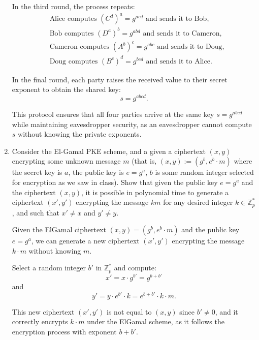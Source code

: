 \documentclass[12pt]{article}
\begin{document}
\begin{enumerate}
In the third round, the process repeats:
\[
\begin{aligned}
    &\text{Alice computes } (C^d)^a = g^{acd} \text{ and sends it to Bob,} \\
    &\text{Bob computes } (D^a)^b = g^{abd} \text{ and sends it to Cameron,} \\
    &\text{Cameron computes } (A^b)^c = g^{abc} \text{ and sends it to Doug,} \\
    &\text{Doug computes } (B^c)^d = g^{bcd} \text{ and sends it to Alice.}
\end{aligned}
\]

In the final round, each party raises the received value to their secret exponent to obtain the shared key:
\[
s = g^{abcd}.
\]

This protocol ensures that all four parties arrive at the same key \( s = g^{abcd} \) while maintaining eavesdropper security, as an eavesdropper cannot compute \( s \) without knowing the private exponents.


\item Consider the El-Gamal PKE scheme, and a given a ciphertext $(x,y)$  encrypting some unknown message $m$ (that is, $(x,y) := (g^b, e^b\cdot m)$ where the secret key is $a$, the public key is $e = g^a$, $b$ is some random integer selected for encryption as we saw in class). 
Show that given the public key $e = g^a$ and the ciphertext $(x,y)$, it is possible in polynomial time to generate a ciphertext $(x',y')$ encrypting the message $km$ for any desired integer $k \in \mathbb{Z}^*_p$, and such that $x' \neq x$ and $y'\neq y$. \newline

Given the ElGamal ciphertext \((x, y) = (g^b, e^b \cdot m)\) and the public key \(e = g^a\), we can generate a new ciphertext \((x', y')\) encrypting the message \(k \cdot m\) without knowing \(m\). 

Select a random integer \(b'\) in \(\mathbb{Z}^*_{p}\) and compute:
\[
x' = x \cdot g^{b'} = g^{b + b'}
\]
and
\[
y' = y \cdot e^{b'} \cdot k = e^{b + b'} \cdot k \cdot m.
\]

This new ciphertext \((x', y')\) is not equal to \((x, y)\) since \(b' \neq 0\), and it correctly encrypts \(k \cdot m\) under the ElGamal scheme, as it follows the encryption process with exponent \(b + b'\).

\end{enumerate}
\end{document}
